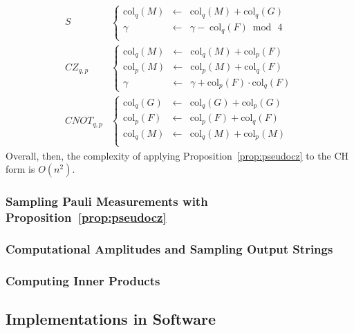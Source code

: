 \begin{align}
S & \left\{
\begin{array}{rcl}
\text{col}_{q}(M)  & \gets & \text{col}_{q}(M)+\text{col}_{q}(G) \\
\gamma & \gets & \gamma - \; \text{col}_{q}(F) \bmod\,4 \\
\end{array}\right. \nonumber \\
CZ_{q,p} & \left\{
\begin{array}{rcl}
\text{col}_{q}(M) & \gets & \text{col}_{q}(M) + \text{col}_{p}(F) \\
\text{col}_{p}(M) & \gets & \text{col}_{p}(M) + \text{col}_{q}(F) \\
\gamma & \gets & \gamma + \text{col}_{p}(F) \cdot \text{col}_{q}(F)
\end{array} \right. \nonumber \\ 
CNOT_{q,p} & \left\{
\begin{array}{rcl}
\text{col}_{q}(G) & \gets & \text{col}_{q}(G) + \text{col}_{p}(G)\\
\text{col}_{p}(F) & \gets & \text{col}_{p}(F) + \text{col}_{q}(F)\\
\text{col}_{q}(M) & \gets & \text{col}_{q}(M) + \text{col}_{p}(M)\\
\end{array}\right.
\end{align}
Overall, then, the complexity of applying Proposition~\ref{prop:pseudocz} to the CH form is $O(n^{2})$.
\subsubsection*{Sampling Pauli Measurements with Proposition~\ref{prop:pseudocz}}
\subsubsection*{Computational Amplitudes and Sampling Output Strings}
\subsubsection*{Computing Inner Products}
\subsection{Implementations in Software}\label{sec:stabilizer_simulators}


